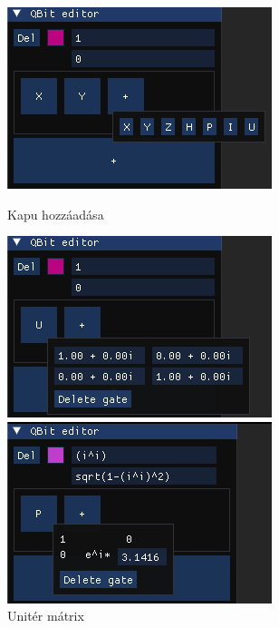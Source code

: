 \documentclass[fontsize=12pt,a4paper]{article}
\begin{document}
\begin{figure}[h]
    \centering
    \begin{minipage}{0.3\linewidth}
        \raggedright
        \includegraphics[width=\linewidth]{App/qubit_gates.png}
        \caption{Kapu hozzáadása}
    \end{minipage}%
    \hfill
    \begin{minipage}{0.3\linewidth}
        \centering
        \includegraphics[width=\linewidth]{App/unitary.png}
        \caption{Unitér mátrix}
    \end{minipage}%
    \hfill
    \begin{minipage}{0.3\linewidth}
        \raggedleft
        \includegraphics[width=\linewidth]{App/phase.png}

\end{minipage}
\end{figure}
\end{document}
